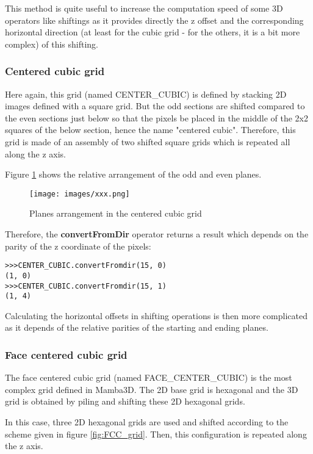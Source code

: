 \documentclass[a4paper,10pt,oneside]{article}
\begin{document}
This method is quite useful to increase the computation speed of some 3D operators like shiftings as it provides directly
the z offset and the corresponding horizontal direction (at least for the cubic grid - for the others, it is a bit more complex)
of this shifting.

\subsubsection{Centered cubic grid}
\label{cha:CCgrid}
Here again, this grid (named CENTER_CUBIC) is defined by stacking 2D images defined with a square grid. But the odd sections
are shifted compared to the even sections just below so that the pixels be placed in the middle of the 2x2 squares of the below
section, hence the name "centered cubic". Therefore, this grid is made of an assembly of two shifted square grids which is
repeated all along the z axis.

Figure \ref{fig:CC_grid} shows the relative arrangement of the odd and even planes.

\begin{figure}
\centering
\texttt{[image: images/xxx.png]}
\caption{Planes arrangement in the centered cubic grid}
\label{fig:CC_grid}
\end{figure}

Therefore, the \textbf{convertFromDir} operator returns a result which depends on the parity of the z coordinate of the pixels:

\lstset{language=Python}
\begin{lstlisting}
>>>CENTER_CUBIC.convertFromdir(15, 0)
(1, 0)
>>>CENTER_CUBIC.convertFromdir(15, 1)
(1, 4)
\end{lstlisting}

Calculating the horizontal offsets in shifting operations is then more complicated as it depends of the relative parities
of the starting and ending planes.

\subsubsection{Face centered cubic grid}
\label{FCCgrid}
The face centered cubic grid (named FACE_CENTER_CUBIC) is the most complex grid defined in Mamba3D. The 2D base grid is hexagonal
and the 3D grid is obtained by piling and shifting these 2D hexagonal grids.

In this case, three 2D hexagonal grids are used and shifted according to the scheme given in figure \ref{fig:FCC_grid}. Then, this configuration
is repeated along the z axis.
\end{document}
